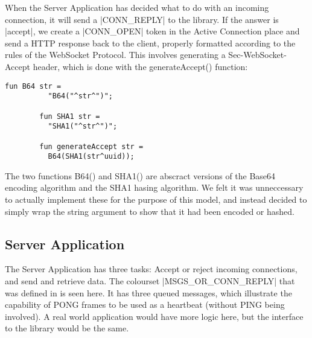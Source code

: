 		When the Server Application has decided what to do with an incoming
		connection, it will send a |CONN_REPLY| to the library. If the
		answer is |accept|, we create a |CONN_OPEN| token in the
		Active Connection place and send a HTTP response back to the client, properly
		formatted according to the rules of the WebSocket Protocol. This involves
		generating a Sec-WebSocket-Accept header, which is done with the
		generateAccept() function:
		
		
		\begin{lstlisting}[label=lst:generateAccept,caption=generateAccept,gobble=2]
		fun B64 str =
		  "B64("^str^")";
		
		fun SHA1 str =
		  "SHA1("^str^")";

		fun generateAccept str =
		  B64(SHA1(str^uuid));
		\end{lstlisting}
		
		The two functions B64() \cite{rfc4648} and SHA1() \cite{fips.180-2} are
		abscract versions of the Base64 encoding algorithm and the SHA1 hasing algorithm. We felt it was unneccessary
		to actually implement these for the purpose of this model, and instead decided
		to simply wrap the string argument to show that it had been encoded or hashed.
		
\subsection{Server Application}
	
	
	The Server Application has three tasks: Accept or reject incoming connections,
	and send and retrieve data. The colourset |MSGS_OR_CONN_REPLY| that
	was defined in  is seen here. It has three
	queued messages, which illustrate the capability of PONG frames to be used as
	a heartbeat (without PING being involved). A real world application would have
	more logic here, but the interface to the library would be the same.
